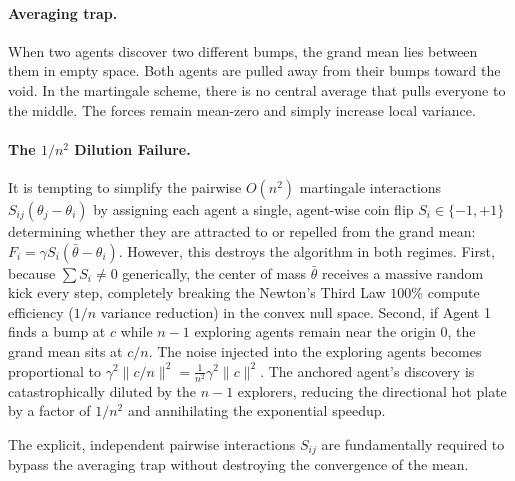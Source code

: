 \documentclass{article}
\begin{document}
\paragraph{Averaging trap.}
When two agents discover two different bumps, the grand mean lies between
them in empty space. Both agents are pulled away from their bumps toward
the void. In the martingale scheme, there is no central average
that pulls everyone to the middle. The forces remain mean-zero and simply increase local variance.

\paragraph{The $1/n^2$ Dilution Failure.}
It is tempting to simplify the pairwise $O(n^2)$ martingale interactions $S_{ij}(\theta_j - \theta_i)$ by assigning each agent a single, agent-wise coin flip $S_i \in \{-1, +1\}$ determining whether they are attracted to or repelled from the grand mean: $F_i = \gamma S_i (\bar{\theta} - \theta_i)$. However, this destroys the algorithm in both regimes. 
First, because $\sum S_i \neq 0$ generically, the center of mass $\bar{\theta}$ receives a massive random kick every step, completely breaking the Newton's Third Law $100\%$ compute efficiency ($1/n$ variance reduction) in the convex null space. 
Second, if Agent 1 finds a bump at $c$ while $n-1$ exploring agents remain near the origin $0$, the grand mean sits at $c/n$. The noise injected into the exploring agents becomes proportional to $\gamma^2 \|c/n\|^2 = \frac{1}{n^2} \gamma^2 \|c\|^2$. The anchored agent's discovery is catastrophically diluted by the $n-1$ explorers, reducing the directional hot plate by a factor of $1/n^2$ and annihilating the exponential speedup. 

The explicit, independent pairwise interactions $S_{ij}$ are fundamentally required to bypass the averaging trap without destroying the convergence of the mean. 
\end{document}
